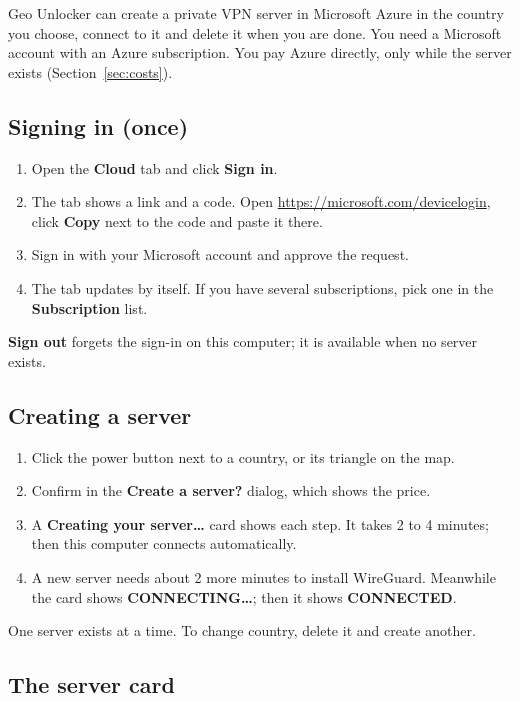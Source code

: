 \documentclass[11pt,a4paper]{article}
\newcommand{\ui}[1]{\textbf{#1}}            %
\begin{document}
Geo Unlocker can create a private VPN server in Microsoft Azure in the country you choose, connect to it and delete it when you are done. You need a Microsoft account with an Azure subscription. You pay Azure directly, only while the server exists (Section~\ref{sec:costs}).

\subsection{Signing in (once)}

\begin{enumerate}
  \item Open the \ui{Cloud} tab and click \ui{Sign in}.
  \item The tab shows a link and a code. Open \url{https://microsoft.com/devicelogin}, click \ui{Copy} next to the code and paste it there.
  \item Sign in with your Microsoft account and approve the request.
  \item The tab updates by itself. If you have several subscriptions, pick one in the \ui{Subscription} list.
\end{enumerate}

\ui{Sign out} forgets the sign-in on this computer; it is available when no server exists.

\subsection{Creating a server}

\begin{enumerate}
  \item Click the power button next to a country, or its triangle on the map.
  \item Confirm in the \ui{Create a server?} dialog, which shows the price.
  \item A \ui{Creating your server\ldots} card shows each step. It takes 2 to 4 minutes; then this computer connects automatically.
  \item A new server needs about 2 more minutes to install WireGuard. Meanwhile the card shows \ui{CONNECTING\ldots}; then it shows \ui{CONNECTED}.
\end{enumerate}

One server exists at a time. To change country, delete it and create another.

\subsection{The server card}
\end{document}
